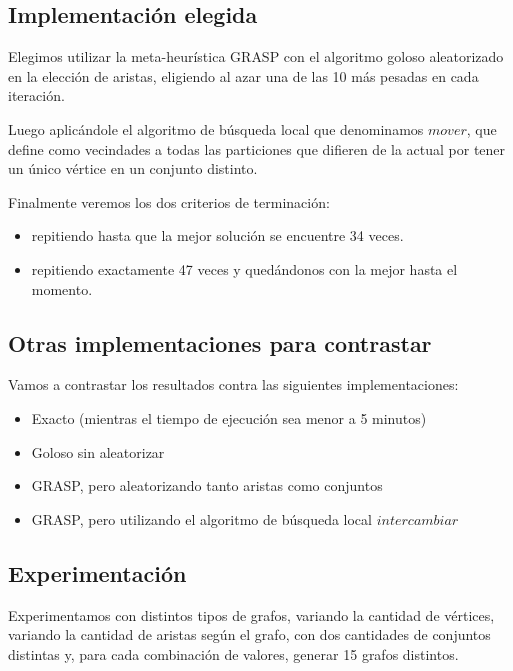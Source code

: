 \subsection{Implementación elegida}

Elegimos utilizar la meta-heurística GRASP con el algoritmo goloso aleatorizado
en la elección de aristas, eligiendo al azar una de las 10 más pesadas en cada
iteración.

Luego aplicándole el algoritmo de búsqueda local que denominamos $mover$, que
define como vecindades a todas las particiones que difieren de la actual por
tener un único vértice en un conjunto distinto.

Finalmente veremos los dos criterios de terminación:
\begin{itemize}
  \item repitiendo hasta que la mejor solución se encuentre 34 veces.
  \item repitiendo exactamente 47 veces y quedándonos con la mejor hasta el momento.
\end{itemize}

\subsection{Otras implementaciones para contrastar}

Vamos a contrastar los resultados contra las siguientes implementaciones:

\begin{itemize}
  \item Exacto (mientras el tiempo de ejecución sea menor a 5 minutos)

  \item Goloso sin aleatorizar

  \item GRASP, pero aleatorizando tanto aristas como conjuntos

  \item GRASP, pero utilizando el algoritmo de búsqueda local $intercambiar$
\end{itemize}

\subsection{Experimentación}

Experimentamos con distintos tipos de grafos, variando la cantidad de vértices,
variando la cantidad de aristas según el grafo, con dos cantidades de conjuntos
distintas y, para cada combinación de valores, generar 15 grafos distintos.


